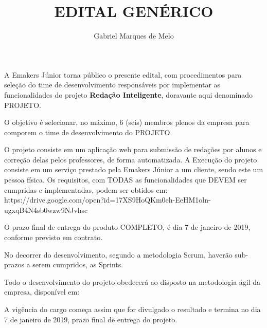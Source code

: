 





\def\titulo{EDITAL GENÉRICO}

\def\projeto{Redação Inteligente}

\title{\titulo}
\author{Gabriel Marques de Melo}



	\initdoc

	A Emakers Júnior torna público o presente edital, com procedimentos para seleção do time de desenvolvimento responsáveis por implementar as funcionalidades do projeto \textbf{\textcolor{purple-emk}{\projeto}}, doravante aqui denominado PROJETO.

	\clausula O objetivo é selecionar, no máximo, 6 (seis) membros plenos da empresa para comporem o time de desenvolvimento do PROJETO.

	\clausula O projeto consiste em um aplicação web para submissão de redações por alunos e correção delas pelos professores, de forma automatizada.
	\clausula A Execução do projeto consiste em um serviço prestado pela Emakers Júnior a um cliente, sendo este um pessoa física.
	\clausula Os requisitos, com TODAS as funcionalidades que DEVEM ser cumpridas e implementadas, podem ser obtidos em:
	https://drive.google.com/open?id=17XS9HoQKm0eh-EeHM1oln-ugxqB4N4sb0wzw9NJvhsc

	\clausula O prazo final de entrega do produto COMPLETO, é dia 7 de janeiro de 2019, conforme previsto em contrato.

	\paragrafo No decorrer do desenvolvimento, segundo a metodologia Scrum, haverão sub-prazos a serem cumpridos, as Sprints.

	\paragrafo Todo o desenvolvimento do projeto obedecerá ao disposto na metodologia ágil da empresa, disponível em:

	


	\clausula A vigência do cargo começa assim que for divulgado o resultado e termina no dia 7 de janeiro de 2019, prazo final de entrega do projeto.

